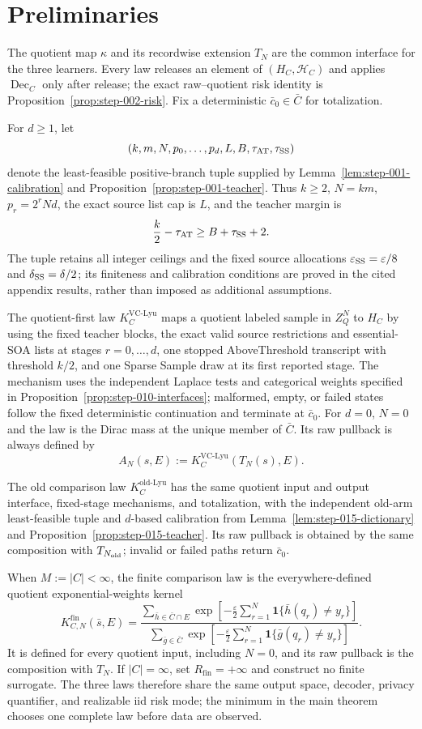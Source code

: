 \section{Preliminaries}

The quotient map $\kappa$ and its recordwise extension $T_N$ are the common
interface for the three learners.  Every law releases an element of
$(H_C,\mathcal H_C)$ and applies $\operatorname{Dec}_C$ only after release;
the exact raw--quotient risk identity is Proposition~\ref{prop:step-002-risk}.
Fix a deterministic $\bar c_0\in\bar C$ for totalization.

For $d\ge1$, let
\[
 (k,m,N,p_0,\ldots,p_d,L,B,\tau_{\rm AT},\tau_{\rm SS})
\]
denote the least-feasible positive-branch tuple supplied by
Lemma~\ref{lem:step-001-calibration} and
Proposition~\ref{prop:step-001-teacher}.  Thus $k\ge2$, $N=km$,
$p_r=2^rNd$, the exact source list cap is $L$, and the teacher margin is
\[
 \frac{k}{2}-\tau_{\rm AT}\ge B+\tau_{\rm SS}+2.
\]
The tuple retains all integer ceilings and the fixed source allocations
$\varepsilon_{\rm SS}=\varepsilon/8$ and
$\delta_{\rm SS}=\delta/2$; its finiteness and calibration conditions are
proved in the cited appendix results, rather than imposed as additional
assumptions.

The quotient-first law $K_C^{\mathrm{VC\text{-}Lyu}}$ maps a quotient labeled
sample in $Z_Q^N$ to $H_C$ by using the fixed teacher blocks, the exact valid
source restrictions and essential-SOA lists at stages $r=0,\ldots,d$, one
stopped AboveThreshold transcript with threshold $k/2$, and one Sparse Sample
draw at its first reported stage.  The mechanism uses the independent
Laplace tests and categorical weights specified in
Proposition~\ref{prop:step-010-interfaces}; malformed, empty, or failed states
follow the fixed deterministic continuation and terminate at $\bar c_0$.
For $d=0$, $N=0$ and the law is the Dirac mass at the unique member of
$\bar C$.  Its raw pullback is always defined by
\[
 A_N(s,E):=K_C^{\mathrm{VC\text{-}Lyu}}(T_N(s),E).
\]

The old comparison law $K_C^{\mathrm{old\text{-}Lyu}}$ has the same quotient
input and output interface, fixed-stage mechanisms, and totalization, with
the independent old-arm least-feasible tuple and $d$-based calibration from
Lemma~\ref{lem:step-015-dictionary} and
Proposition~\ref{prop:step-015-teacher}.  Its raw pullback is obtained by
the same composition with $T_{N_{\rm old}}$; invalid or failed paths return
$\bar c_0$.

When $M:=|C|<\infty$, the finite comparison law is the everywhere-defined
quotient exponential-weights kernel
\[
K^{\mathrm{fin}}_{C,N}(\bar s,E)=
\frac{\displaystyle\sum_{\bar h\in\bar C\cap E}
 \exp\!\left[-\frac{\varepsilon}{2}\sum_{r=1}^N
 \mathbf1\{\bar h(q_r)\ne y_r\}\right]}
 {\displaystyle\sum_{\bar g\in\bar C}
 \exp\!\left[-\frac{\varepsilon}{2}\sum_{r=1}^N
 \mathbf1\{\bar g(q_r)\ne y_r\}\right]}.
\]
It is defined for every quotient input, including $N=0$, and its raw
pullback is the composition with $T_N$.  If $|C|=\infty$, set
$R_{\mathrm{fin}}=+\infty$ and construct no finite surrogate.  The three
laws therefore share the same output space, decoder, privacy quantifier,
and realizable iid risk mode; the minimum in the main theorem chooses one
complete law before data are observed.

